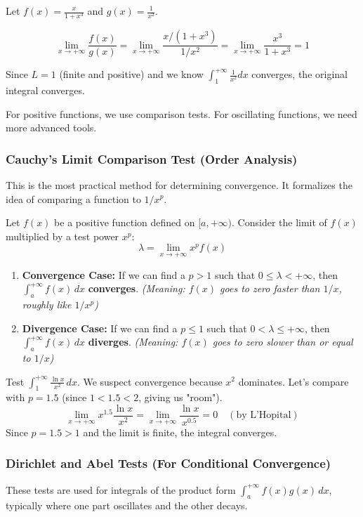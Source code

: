 \documentclass[oneside]{book}
\begin{document}
Let $f(x) = \frac{x}{1+x^3}$ and $g(x) = \frac{1}{x^2}$.

\[
\lim_{x \to +\infty} \frac{f(x)}{g(x)} = \lim_{x \to +\infty} \frac{x/(1+x^3)}{1/x^2} = \lim_{x \to +\infty} \frac{x^3}{1+x^3} = 1
\]

Since $L=1$ (finite and positive) and we know $\int_1^{+\infty} \frac{1}{x^2} dx$ converges, the original integral converges.



For positive functions, we use comparison tests. For oscillating functions, we need more advanced tools.

\subsubsection{Cauchy's Limit Comparison Test (Order Analysis)}
This is the most practical method for determining convergence. It formalizes the idea of comparing a function to $1/x^p$.

\begin{theorem}
Let $f(x)$ be a positive function defined on $[a, +\infty)$. Consider the limit of $f(x)$ multiplied by a test power $x^p$:
\[
\lambda = \lim_{x \to +\infty} x^p f(x)
\]
\begin{enumerate}
    \item \textbf{Convergence Case:} If we can find a $p > 1$ such that $0 \le \lambda < +\infty$, then $\int_a^{+\infty} f(x) \, dx$ \textbf{converges}.
    \textit{(Meaning: $f(x)$ goes to zero faster than $1/x$, roughly like $1/x^p$)}
    
    \item \textbf{Divergence Case:} If we can find a $p \le 1$ such that $0 < \lambda \le +\infty$, then $\int_a^{+\infty} f(x) \, dx$ \textbf{diverges}.
    \textit{(Meaning: $f(x)$ goes to zero slower than or equal to $1/x$)}
\end{enumerate}
\end{theorem}

\begin{example}
Test $\int_1^{+\infty} \frac{\ln x}{x^2} \, dx$.
We suspect convergence because $x^2$ dominates. Let's compare with $p=1.5$ (since $1 < 1.5 < 2$, giving us "room").
\[
\lim_{x \to +\infty} x^{1.5} \frac{\ln x}{x^2} = \lim_{x \to +\infty} \frac{\ln x}{x^{0.5}} = 0 \quad (\text{by L'Hopital})
\]
Since $p=1.5 > 1$ and the limit is finite, the integral converges.
\end{example}

\subsubsection{Dirichlet and Abel Tests (For Conditional Convergence)}
These tests are used for integrals of the product form $\int_a^{+\infty} f(x)g(x) \, dx$, typically where one part oscillates and the other decays.
\end{document}
